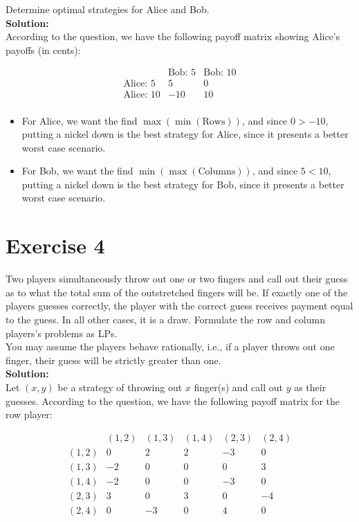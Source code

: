 \documentclass{article}
\begin{document}
Determine optimal strategies for Alice and Bob. \\

\textbf{Solution: } \\

According to the question, we have the following payoff matrix showing Alice's payoffs (in cents):

\[
\begin{array}{c|cc}
& \text{Bob: 5} & \text{Bob: 10} \\
\hline
\text{Alice: 5} & 5 & 0 \\
\text{Alice: 10} & -10 & 10 \\
\end{array}
\]

\begin{itemize}
    \item For Alice, we want the find $\max(\min(\text{Rows}))$, and since $0 > -10$, putting a nickel down is the best strategy for Alice, since it presents a better worst case scenario.
    \item For Bob, we want the find $\min(\max(\text{Columns}))$, and since $5 < 10$, putting a nickel down is the best strategy for Bob, since it presents a better worst case scenario.
\end{itemize}

\newpage

\section*{Exercise 4}
Two players simultaneously throw out one or two fingers and call out their guess as to what the total sum of the outstretched fingers will be. If exactly one of the players guesses correctly, the player with the correct guess receives payment equal to the guess. In all other cases, it is a draw. Formulate the row and column players's problems as LPs. \\

You may assume the players behave rationally, i.e., if a player throws out one finger, their guess will be strictly greater than one. \\

\textbf{Solution: } \\

Let $(x,y)$ be a strategy of throwing out $x$ finger(s) and call out $y$ as their guesses. According to the question, we have the following payoff matrix for the row player:

\[
\begin{array}{c|ccccc}
 & (1,2) & (1,3) & (1,4) & (2,3) & (2,4) \\
\hline
(1,2) & 0 & 2 & 2 & -3 & 0 \\
(1,3) & -2 & 0 & 0 & 0 & 3 \\
(1,4) & -2 & 0 & 0 & -3 & 0 \\
(2,3) & 3 & 0 & 3 & 0 & -4 \\
(2,4) & 0 & -3 & 0 & 4 & 0 \\
\end{array}
\] \\
\end{document}
